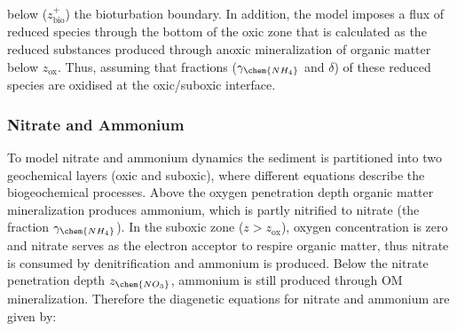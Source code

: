 \documentclass[gmd, manuscript]{copernicus}
\begin{document}
below ($z_{\mathrm{bio}}^+$) the bioturbation boundary. In addition, the model imposes a flux of reduced species through the bottom of the oxic zone that is calculated as the reduced substances produced through anoxic mineralization 
of organic matter below $z_{\mathrm{ox}}$. Thus, assuming that fractions ($\gamma_{\chem{NH_4}}$ and $\delta$) of these reduced species are oxidised at the oxic/suboxic interface.
\subsubsection{Nitrate and Ammonium}
To model nitrate and ammonium dynamics the sediment is partitioned into two geochemical layers (oxic and suboxic), where different equations describe the biogeochemical processes. 
Above the oxygen penetration depth organic matter mineralization produces ammonium, which is partly nitrified to nitrate (the fraction $\gamma_{\chem{NH_4}}$). 
In the suboxic zone ($z>z_{\mathrm{ox}}$), oxygen concentration is zero and nitrate serves as the electron acceptor to respire organic matter, thus nitrate is consumed by denitrification and ammonium is produced. Below the nitrate 
penetration depth $z_{\chem{NO_3}}$, ammonium is still produced through OM mineralization. Therefore the diagenetic equations for nitrate and ammonium are given by:
\end{document}
